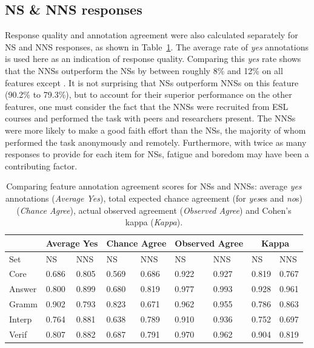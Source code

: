 \subsection{NS \& NNS responses}
\label{NSandNNSagreement}
Response quality and annotation agreement were also calculated separately for NS and NNS responses, as shown in Table~\ref{tab:NSvNNSagreement}. The average rate of \textit{yes} annotations is used here as an indication of response quality. Comparing this \textit{yes} rate shows that the NNSs outperform the NSs by between roughly 8\% and 12\% on all features except . It is not surprising that NSs outperform NNSs on this feature (90.2\% to 79.3\%), but to account for their superior performance on the other features, one must consider the fact that the NNSs were recruited from ESL courses and performed the task with peers and researchers present. The NNSs were more likely to make a good faith effort than the NSs, the majority of whom performed the task anonymously and remotely. Furthermore, 
with twice as many responses to provide for each item for NSs, fatigue and boredom may have been a contributing factor.


\begin{table}[htb!]
\begin{center}
\begin{tabular}{|l||l|l||l|l||l|l||l|l|}
\hline
 & \multicolumn{2}{|c||}{Average Yes} & \multicolumn{2}{|c||}{Chance Agree} & \multicolumn{2}{|c||}{Observed Agree} & \multicolumn{2}{|c|}{Kappa} \\
\hline
 Set & NS & NNS & NS & NNS & NS & NNS & NS & NNS \\
\hline
\hline
Core  & 0.686 & 0.805 & 0.569 & 0.686 & 0.922 & 0.927 & 0.819 & 0.767 \\
\hline
Answer  & 0.800 & 0.899 & 0.680 & 0.819 & 0.977 & 0.993 & 0.928 & 0.961 \\
\hline
Gramm  & 0.902 & 0.793 & 0.823 & 0.671 & 0.962 & 0.955 & 0.786 & 0.863 \\
\hline
Interp  & 0.764 & 0.881 & 0.638 & 0.789 & 0.910 & 0.936 &  0.752 & 0.697 \\
\hline
Verif  & 0.807 & 0.882 & 0.687 & 0.791 & 0.970 & 0.962 & 0.904 & 0.819 \\
\hline
\end{tabular}
\caption{\label{tab:NSvNNSagreement} Comparing feature annotation agreement scores for NSs and NNSs: average \textit{yes} annotations (\textit{Average Yes}), total expected chance agreement (for \textit{yes}es and \textit{no}s) (\textit{Chance Agree}), actual observed agreement (\textit{Observed Agree}) and Cohen's kappa (\textit{Kappa}).}
\end{center}
\end{table}

